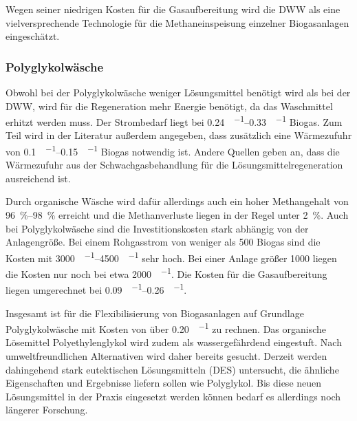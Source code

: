 Wegen seiner niedrigen Kosten für die Gasaufbereitung wird die \gls{DWW} als eine vielversprechende Technologie für die Methaneinspeisung einzelner Biogasanlagen eingeschätzt.\smallskip


\subsubsection{Polyglykolwäsche}
Obwohl bei der Polyglykolwäsche weniger Lösungsmittel benötigt wird als bei der \gls{DWW}, wird für die Regeneration mehr Energie benötigt, da das Waschmittel erhitzt werden muss. Der Strombedarf liegt bei \SIrange{0,24}{0,33}{\kwh\per\normvol} Biogas. Zum Teil wird in der Literatur außerdem angegeben, dass zusätzlich eine Wärmezufuhr von \SIrange{0,1}{0,15}{\kwh\per\normvol} Biogas notwendig ist. Andere Quellen geben an, dass die Wärmezufuhr aus der Schwachgasbehandlung für die Lösungsmittelregeneration ausreichend ist. \parencite{Emp18}\smallskip

Durch organische Wäsche wird dafür allerdings auch ein hoher Methangehalt von \SIrange{96}{98}{\percent} erreicht und die Methanverluste liegen in der Regel unter \SI{2}{\percent}. Auch bei Polyglykolwäsche sind die Investitionskosten stark abhängig von der Anlagengröße. Bei einem Rohgasstrom von weniger als \SI{500}{\normvolh} Biogas sind die Kosten mit \SIrange{3000}{4500}{\sieuro\per\normvolh} sehr hoch. Bei einer Anlage größer \SI{1000}{\normvolh} liegen die Kosten nur noch bei etwa \SI{2000}{\sieuro\per\normvolh}. Die Kosten für die Gasaufbereitung liegen umgerechnet bei \SIrange{0,09}{0,26}{\sieuro\per\normvol}. \parencite{FNR14}\smallskip

Insgesamt ist für die Flexibilisierung von Biogasanlagen auf Grundlage Polyglykolwäsche mit Kosten von über \SI{0,20}{\sieuro\per\normvol} zu rechnen. Das organische Lösemittel Polyethylenglykol wird zudem als wassergefährdend eingestuft. Nach umweltfreundlichen Alternativen wird daher bereits gesucht. Derzeit werden dahingehend stark eutektischen Lösungsmitteln (DES) untersucht, die ähnliche Eigenschaften und Ergebnisse liefern sollen wie Polyglykol. Bis diese neuen Lösungsmittel in der Praxis eingesetzt werden können bedarf es allerdings noch längerer Forschung. \parencite{FNR14} \parencite{Struk20}


